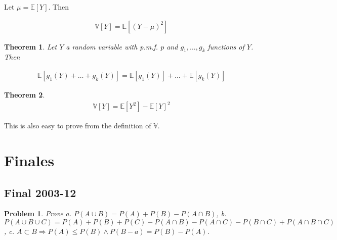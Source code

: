 \documentclass[a4paper, 12pt]{article}
\newtheorem{problem}{Problem}
\newtheorem{theorem}{Theorem}
\newtheorem{problem}{Problem}
\newtheorem{theorem}{Theorem}
\begin{document}
\begin{definition}
    Let $\mu = \mathbb{E}\left[ Y \right] $. Then 

    \begin{align*}
        \mathbb{V}\left[ Y \right] = \mathbb{E} \left[ ( Y - \mu )^2 \right] 
    \end{align*}
\end{definition}

\begin{theorem}
    Let $Y$ a random variable with p.m.f. $p$ and $g_1, \ldots, g_k$ functions
    of $Y$. Then 

    \begin{align*}
        \mathbb{E} \left[ g_1(Y) + \ldots + g_k(Y) \right] = \mathbb{E}\left[
        g_1(Y) \right] + \ldots + \mathbb{E}\left[ g_k(Y) \right] 
    \end{align*}
\end{theorem}

\begin{theorem}
    \begin{align*}
    \mathbb{V}[Y] = \mathbb{E}[Y^2] - \mathbb{E}[Y]^2
    \end{align*}
\end{theorem}

This is also easy to prove from the definition of $\mathbb{V}$. 

\pagebreak

\section{Finales}

\subsection{Final 2003-12}

\begin{problem}
    Prove \textit{a.} $P(A \cup B) = P(A) + P(B) - P(A \cap B)$, \textit{b.}
    $P(A \cup B \cup C) = P(A) + P(B) + P(C) - P(A \cap B) - P(A \cap C) - P(B
    \cap C) + P(A \cap B \cap C)$, \textit{c.} $A \subset B \Rightarrow P(A) \leq
    P(B) \land P(B - a) = P(B) - P(A)$.
\end{problem}
\end{document}
